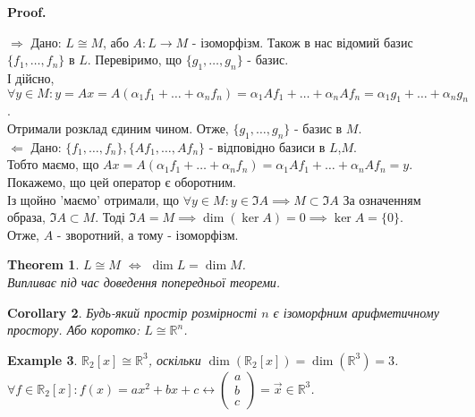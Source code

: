 \documentclass[a4paper, 10pt]{article}
\makeatletter
\def\rightproof{$\boxed{\Rightarrow}$ }
\def\leftproof{$\boxed{\Leftarrow}$ }
\theoremstyle{theoremdd}
\newtheorem{theorem}{Theorem}[subsection]
\newtheorem{example}[theorem]{Example}
\newtheorem{corollary}[theorem]{Corollary}
\renewenvironment{proof}[1][Proof.\\]{\par
\pushQED{\hfill \qed}%
\normalfont \topsep6\p@\@plus6\p@\relax
\trivlist
\item\relax
{\bfseries
#1\@addpunct{.}}\hspace\labelsep\ignorespaces
}{%
\popQED\endtrivlist\@endpefalse
}
\makeatother
\begin{document}
	\begin{proof}
	\rightproof Дано: $L \cong M$, або $A: L \to M$ - ізоморфізм. Також в нас відомий базис $\{f_1,\dots,f_n\}$ в $L$. Перевіримо, що $\{g_1,\dots,g_n\}$ - базис.\\
	І дійсно, $\forall y \in M: y = Ax = A(\alpha_1 f_1 + \dots + \alpha_n f_n) = \alpha_1 Af_1 + \dots + \alpha_n Af_n = \alpha_1 g_1 + \dots + \alpha_n g_n$.\\
	Отримали розклад єдиним чином. Отже, $\{g_1,\dots,g_n\}$ - базис в $M$.
	\bigskip \\
	\leftproof Дано: $\{f_1,\dots,f_n\}, \{Af_1,\dots,Af_n\}$ - відповідно базиси в $L$,$M$.\\
	Тобто маємо, що $Ax = A(\alpha_1 f_1 + \dots + \alpha_n f_n) = \alpha_1 Af_1 + \dots + \alpha_n Af_n = y$.\\
	Покажемо, що цей оператор є оборотним.\\
Із щойно 'маємо' отримали, що $\forall y \in M: y \in \Im A \implies M \subset \Im A$ За означенням образа, $\Im A \subset M$. Тоді $\Im A = M \implies \dim(\ker A) = 0 \implies \ker A = \{0\}$.\\
	Отже, $A$ - зворотний, а тому - ізоморфізм.
	\end{proof}
	
	\begin{theorem}
	$L \cong M$ $\iff$ $\dim L = \dim M$.\\
	\textit{Випливає під час доведення попередньої теореми.}
	\end{theorem}
	
	\begin{corollary}
	Будь-який простір розмірності $n$ є ізоморфним арифметичному простору. Або коротко: $L \cong \mathbb{R}^n$.
	\end{corollary}
	
	\begin{example}
	$\mathbb{R}_2[x] \cong \mathbb{R}^3$, оскільки $\dim(\mathbb{R}_2[x]) = \dim (\mathbb{R}^3) = 3$.\\
	$\forall f \in \mathbb{R}_2[x]: f(x) = ax^2 + bx +c \leftrightarrow \begin{pmatrix}
	a \\ b \\ c
	\end{pmatrix} = \vec{x} \in \mathbb{R}^3$.
	\end{example}
	
\end{document}
